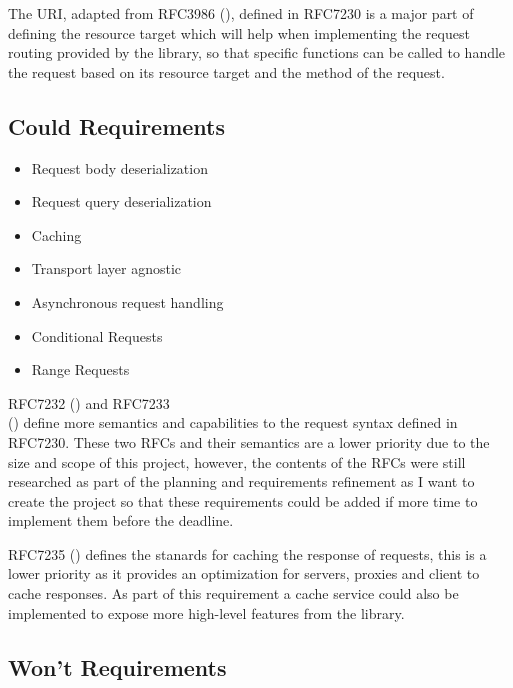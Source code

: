 \documentclass[12pt, a4paper]{article}
\begin{document}
The URI, adapted from RFC3986 (\cite{rfc3986}), defined in RFC7230 is a major part of defining 
the resource target which will help when implementing the request routing provided by the library,
so that specific functions can be called to handle the request based on its resource target and the
method of the request.

\subsection{Could Requirements}

\begin{itemize}
    \item\label{creq:request-body-deserialization} Request body deserialization
    \item\label{creq:request-query-deserialization} Request query deserialization
    \item\label{creq:caching-service} Caching
    \item\label{creq:transport-layer-agnostic} Transport layer agnostic
    \item\label{creq:asynchronous-request-handling} Asynchronous request handling
    \item\label{creq:conditional-requests} Conditional Requests
    \item\label{creq:range-requests} Range Requests
\end{itemize}

RFC7232 (\cite{rfc7232}) and RFC7233\\ (\cite{rfc7233}) define more semantics and capabilities to the
request syntax defined in RFC7230. These two RFCs and their semantics are a lower priority due to the
size and scope of this project, however, the contents of the RFCs were still researched as part of
the planning and requirements refinement as I want to create the project so that these requirements
could be added if more time to implement them before the deadline.

RFC7235 (\cite{rfc7234}) defines the stanards for caching the response of requests, this is a lower
priority as it provides an optimization for servers, proxies and client to cache responses. As part
of this requirement a cache service could also be implemented to expose more high-level features
from the library.

\subsection{Won't Requirements}
\end{document}
